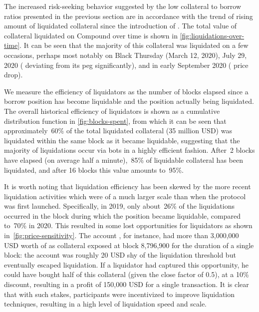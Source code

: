 The increased risk-seeking behavior suggested by the low collateral to borrow ratios presented in the previous section are in accordance with the trend of rising amount of liquidated collateral since the introduction of .  
The total value of collateral liquidated on Compound over time is shown in \autoref{fig:liquidations-over-time}.
It can be seen that the majority of this collateral was liquidated on a few occasions, perhaps most notably on Black Thursday (March 12, 2020), July 29, 2020 ( deviating from its peg significantly), and in early September 2020 ( price drop).

We measure the efficiency of liquidators as the number of blocks elapsed since a borrow position has become liquidable and the position actually being liquidated.
The overall historical efficiency of liquidators is shown as a cumulative distribution function in \autoref{fig:blocks-spent}, from which it can be seen that approximately~60\% of the total liquidated collateral (35 million USD) was liquidated within the same block as it became liquidable, suggesting that the majority of liquidations occur via bots in a highly efficient fashion.
After~2 blocks have elapsed (on average half a minute),~85\% of liquidable collateral has been liquidated, and after 16 blocks this value amounts to~95\%.

It is worth noting that liquidation efficiency has been skewed by the more recent liquidation activities which were of a much larger scale than when the protocol was first launched.
Specifically, in 2019, only about~26\% of the liquidations occurred in the block during which the position became liquidable, compared to~70\% in 2020.
This resulted in some lost opportunities for liquidators as shown in~\autoref{fig:price-sensitivity}.
The account , for instance, had more than 3,000,000 USD worth of  as collateral exposed at block 8,796,900 for the duration of a single block: the account was roughly 20 USD shy of the liquidation threshold but eventually escaped liquidation.
If a liquidator had captured this opportunity, he could have bought half of this collateral (given the close factor of 0.5), at a 10\% discount, resulting in a profit of 150,000 USD for a single transaction.
It is clear that with such stakes, participants were incentivized to improve liquidation techniques, resulting in a high level of liquidation speed and scale.

